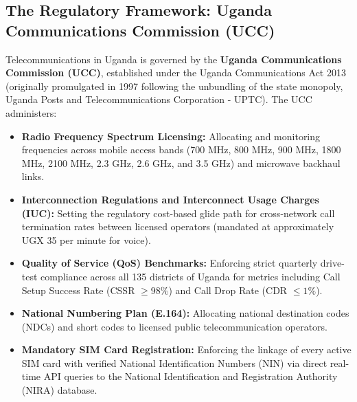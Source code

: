\documentclass[12pt,a4paper]{report}
\begin{document}
\subsection{The Regulatory Framework: Uganda Communications Commission (UCC)}
Telecommunications in Uganda is governed by the \textbf{Uganda Communications Commission (UCC)}, established under the Uganda Communications Act 2013 (originally promulgated in 1997 following the unbundling of the state monopoly, Uganda Posts and Telecommunications Corporation - UPTC). The UCC administers:
\begin{itemize}
    \item \textbf{Radio Frequency Spectrum Licensing:} Allocating and monitoring frequencies across mobile access bands (700 MHz, 800 MHz, 900 MHz, 1800 MHz, 2100 MHz, 2.3 GHz, 2.6 GHz, and 3.5 GHz) and microwave backhaul links.
    \item \textbf{Interconnection Regulations and Interconnect Usage Charges (IUC):} Setting the regulatory cost-based glide path for cross-network call termination rates between licensed operators (mandated at approximately UGX 35 per minute for voice).
    \item \textbf{Quality of Service (QoS) Benchmarks:} Enforcing strict quarterly drive-test compliance across all 135 districts of Uganda for metrics including Call Setup Success Rate (CSSR $\ge 98\%$) and Call Drop Rate (CDR $\le 1\%$).
    \item \textbf{National Numbering Plan (E.164):} Allocating national destination codes (NDCs) and short codes to licensed public telecommunication operators.
    \item \textbf{Mandatory SIM Card Registration:} Enforcing the linkage of every active SIM card with verified National Identification Numbers (NIN) via direct real-time API queries to the National Identification and Registration Authority (NIRA) database.
\end{itemize}
\end{document}
